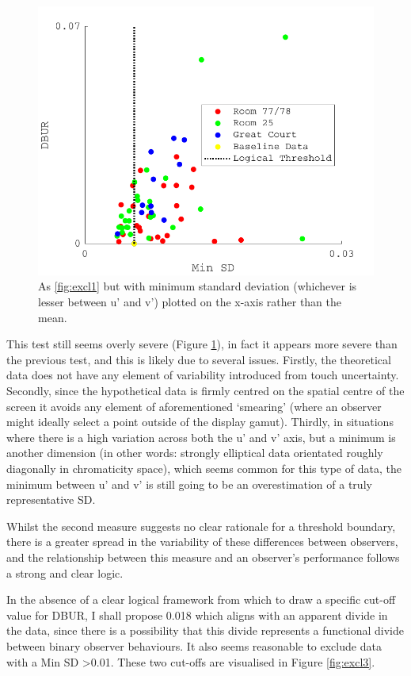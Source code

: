 \begin{figure}[hbtp] 
\includegraphics[max width=\textwidth]{figs/tablet/excl2.pdf} 
\caption{As \ref{fig:excl1} but with minimum standard deviation (whichever is lesser between u' and v') plotted on the x-axis rather than the mean.}
\label{fig:excl2}
\end{figure}

This test still seems overly severe (Figure \ref{fig:excl2}), in fact it appears more severe than the previous test, and this is likely due to several issues. Firstly, the theoretical data does not have any element of variability introduced from touch uncertainty. Secondly, since the hypothetical data is firmly centred on the spatial centre of the screen it avoids any element of aforementioned `smearing' (where an observer might ideally select a point outside of the display gamut). Thirdly, in situations where there is a high variation across both the u' and v' axis, but a minimum is another dimension (in other words: strongly elliptical data orientated roughly diagonally in chromaticity space), which seems common for this type of data, the minimum between u' and v' is still going to be an overestimation of a truly representative SD.

Whilst the second measure suggests no clear rationale for a threshold boundary, there is a greater spread in the variability of these differences between observers, and the relationship between this measure and an observer's performance follows a strong and clear logic.

In the absence of a clear logical framework from which to draw a specific cut-off value for DBUR, I shall propose 0.018 which aligns with an apparent divide in the data, since there is a possibility that this divide represents a functional divide between binary observer behaviours. It also seems reasonable to exclude data with a Min SD \textgreater 0.01. These two cut-offs are visualised in Figure \ref{fig:excl3}. %

